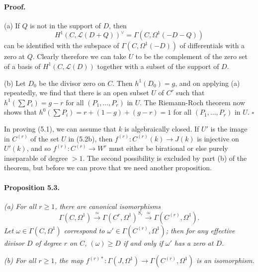 

\paragraph{Proof.}
(a) If $Q$ is not in the support of $D$, then
\[
  H^1(C, \mathcal{L}(D + Q))^{\vee} = \Gamma(C, \Omega^1(-D - Q))
\]
can be identified with the subspace of $\Gamma(C, \Omega^1(-D))$ of
differentials with a zero at $Q$. Clearly therefore we can take $U$ to be the
complement of the zero set of a basis of $H^1(C, \mathcal{L}(D))$ together
with a subset of the support of $D$.

(b) Let $D_0$ be the divisor zero on $C$. Then $h^1(D_0) = g$, and on
applying (a) repeatedly, we find that there is an open subset $U$ of $C^r$
such that $h^1(\sum P_i) = g - r$ for all $(P_1, \dots, P_r)$ in $U$. The
Riemann-Roch theorem now shows that
$h^0(\sum P_i) = r + (1 - g) + (g - r) = 1$ for all $(P_1, \dots, P_r)$ in
$U$. \hfill $\square$

In proving (5.1), we can assume that $k$ is algebraically closed. If $U'$ is
the image in $C^{(r)}$ of the set $U$ in (5.2b), then
$f^{(r)} \colon C^{(r)}(k) \to J(k)$ is injective on $U'(k)$, and so
$f^{(r)} \colon C^{(r)} \to W^r$ must either be birational or else purely
inseparable of degree $> 1$. The second possibility is excluded by part (b)
of the theorem, but before we can prove that we need another proposition.

\paragraph{Proposition 5.3.}
\textit{(a) For all $r \ge 1$, there are canonical isomorphisms}
\[
  \Gamma(C, \Omega^1) \xrightarrow{\;\simeq\;} \Gamma(C^r, \Omega^1)^{S_r}
  \xrightarrow{\;\simeq\;} \Gamma(C^{(r)}, \Omega^1).
\]
\textit{Let $\omega \in \Gamma(C, \Omega^1)$ correspond to
$\omega' \in \Gamma(C^{(r)}, \Omega^1)$; then for any effective divisor $D$
of degree $r$ on $C$, $(\omega) \ge D$ if and only if $\omega'$ has a zero at
$D$.}

\textit{(b) For all $r \ge 1$, the map
$f^{(r)*} \colon \Gamma(J, \Omega^1) \to \Gamma(C^{(r)}, \Omega^1)$ is an
isomorphism.}

